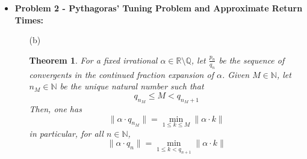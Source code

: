 \documentclass[12pt, reqno]{amsart}
\newtheorem{theorem}{Theorem}[section]
\theoremstyle{definition}
\theoremstyle{remark}
\begin{document}
\begin{itemize}
\begin{proof}
\end{proof}

\vspace{0.2 cm}

\item {\bf{Problem 2 - Pythagoras' Tuning Problem and Approximate Return Times:}} 

\vspace{0.1 cm}
\begin{itemize}


\vspace{0.1 cm}
\item[(b)] %


\begin{theorem}
For a fixed irrational $\alpha\in \mathbb{R}\setminus\mathbb{Q}$, let $\frac{p_{n}}{q_{n}}$ be the sequence of convergents in the continued fraction expansion of $\alpha$. Given $M\in \mathbb{N}$, let $n_{M}\in \mathbb{N}$ be the unique natural number such that $$q_{n_{M}}\le M< q_{n_{M}+1}$$Then, one has
\begin{equation} \label{approx_ret}
\|\alpha\cdot q_{n_{M}}\|=\min_{1\le k\le M}\|\alpha\cdot k\|
\end{equation}
in particular, for all $n\in \mathbb{N}$, $$\|\alpha\cdot q_{n}\|=\min_{1\le k<q_{n+1}}\|\alpha\cdot k\|$$
\end{theorem}


\end{itemize}
\end{itemize}
\end{document}
